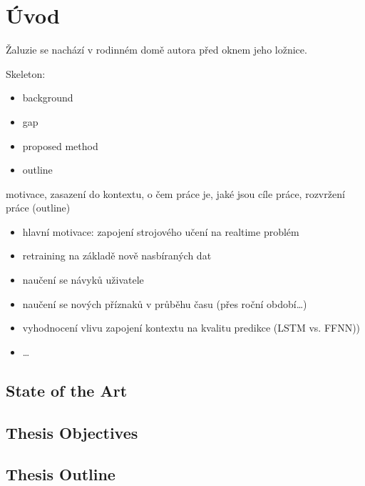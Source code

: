 \chapter{Úvod} \label{chap:introduction}
Žaluzie se nachází v rodinném domě autora před oknem jeho ložnice.

Skeleton:
\begin{itemize}
    \item background
    \item gap
    \item proposed method
    \item outline
\end{itemize}

motivace, zasazení do kontextu, o čem práce je, jaké jsou cíle práce, rozvržení práce (outline)
\begin{itemize}
    \item hlavní motivace: zapojení strojového učení na realtime problém
    \item retraining na základě nově nasbíraných dat
    \item naučení se návyků uživatele
    \item naučení se nových příznaků v průběhu času (přes roční období…)
    \item vyhodnocení vlivu zapojení kontextu na kvalitu predikce (LSTM vs. FFNN))
    \item …
\end{itemize}


\section{State of the Art} \label{sec:state_of_the_art}

\section{Thesis Objectives} \label{sec:thesis_objectives}

\section{Thesis Outline} \label{sec:thesis_outline}
